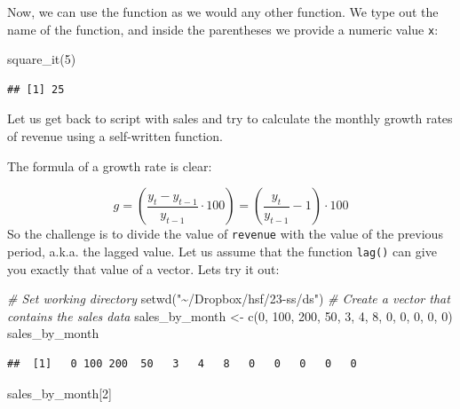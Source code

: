 \documentclass[
  12pt,
  oneside]{book}
\newenvironment{Shaded}{\begin{snugshade}}{\end{snugshade}}
\newcommand{\CommentTok}[1]{\textcolor[rgb]{0.56,0.35,0.01}{\textit{#1}}}
\newcommand{\DecValTok}[1]{\textcolor[rgb]{0.00,0.00,0.81}{#1}}
\newcommand{\FunctionTok}[1]{\textcolor[rgb]{0.00,0.00,0.00}{#1}}
\newcommand{\NormalTok}[1]{#1}
\newcommand{\OtherTok}[1]{\textcolor[rgb]{0.56,0.35,0.01}{#1}}
\newcommand{\StringTok}[1]{\textcolor[rgb]{0.31,0.60,0.02}{#1}}
\begin{document}
Now, we can use the function as we would any other function. We type out the name of the function, and inside the parentheses we provide a numeric value \texttt{x}:

\begin{Shaded}
\begin{Highlighting}[]
\FunctionTok{square\_it}\NormalTok{(}\DecValTok{5}\NormalTok{)}
\end{Highlighting}
\end{Shaded}

\begin{verbatim}
## [1] 25
\end{verbatim}

Let us get back to script with sales and try to calculate the monthly growth rates of revenue using a self-written function.

The formula of a growth rate is clear:

\[g=\left(\frac{y_t-y_{t-1}}{y_{t-1}}\cdot 100\right)=\left(\frac{y_t}{y_{t-1}}-1\right)\cdot 100\]
So the challenge is to divide the value of \texttt{revenue} with the value of the previous period, a.k.a. the lagged value. Let us assume that the function \texttt{lag()} can give you exactly that value of a vector. Lets try it out:

\begin{Shaded}
\begin{Highlighting}[]
\CommentTok{\# Set working directory}
\FunctionTok{setwd}\NormalTok{(}\StringTok{"\textasciitilde{}/Dropbox/hsf/23{-}ss/ds"}\NormalTok{)}
\CommentTok{\# Create a vector that contains the sales data}
\NormalTok{sales\_by\_month }\OtherTok{\textless{}{-}} \FunctionTok{c}\NormalTok{(}\DecValTok{0}\NormalTok{, }\DecValTok{100}\NormalTok{, }\DecValTok{200}\NormalTok{, }\DecValTok{50}\NormalTok{, }\DecValTok{3}\NormalTok{, }\DecValTok{4}\NormalTok{, }\DecValTok{8}\NormalTok{, }\DecValTok{0}\NormalTok{, }\DecValTok{0}\NormalTok{, }\DecValTok{0}\NormalTok{, }\DecValTok{0}\NormalTok{, }\DecValTok{0}\NormalTok{)}
\NormalTok{sales\_by\_month}
\end{Highlighting}
\end{Shaded}

\begin{verbatim}
##  [1]   0 100 200  50   3   4   8   0   0   0   0   0
\end{verbatim}

\begin{Shaded}
\begin{Highlighting}[]
\NormalTok{sales\_by\_month[}\DecValTok{2}\NormalTok{]}
\end{Highlighting}
\end{Shaded}
\end{document}
